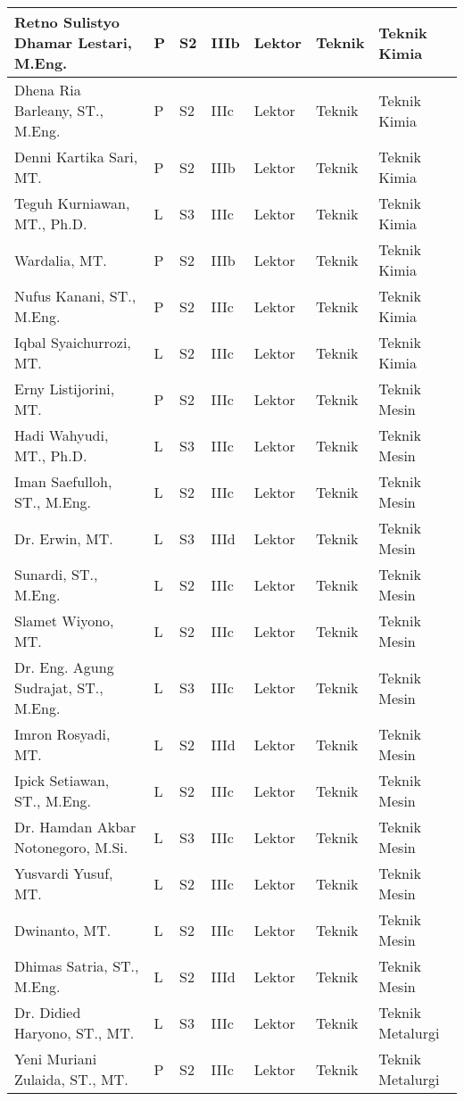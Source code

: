 \documentclass[
]{book}
\begin{document}
\begin{longtable}{l|l|l|l|l|l|l}
Retno Sulistyo Dhamar Lestari, M.Eng. & P & S2 & IIIb & Lektor & Teknik & Teknik Kimia\\
\hline
Dhena Ria Barleany, ST., M.Eng. & P & S2 & IIIc & Lektor & Teknik & Teknik Kimia\\
\hline
Denni Kartika Sari, MT. & P & S2 & IIIb & Lektor & Teknik & Teknik Kimia\\
\hline
Teguh Kurniawan, MT., Ph.D. & L & S3 & IIIc & Lektor & Teknik & Teknik Kimia\\
\hline
Wardalia, MT. & P & S2 & IIIb & Lektor & Teknik & Teknik Kimia\\
\hline
Nufus Kanani, ST., M.Eng. & P & S2 & IIIc & Lektor & Teknik & Teknik Kimia\\
\hline
Iqbal Syaichurrozi, MT. & L & S2 & IIIc & Lektor & Teknik & Teknik Kimia\\
\hline
Erny Listijorini, MT. & P & S2 & IIIc & Lektor & Teknik & Teknik Mesin\\
\hline
Hadi Wahyudi, MT., Ph.D. & L & S3 & IIIc & Lektor & Teknik & Teknik Mesin\\
\hline
Iman Saefulloh, ST., M.Eng. & L & S2 & IIIc & Lektor & Teknik & Teknik Mesin\\
\hline
Dr. Erwin, MT. & L & S3 & IIId & Lektor & Teknik & Teknik Mesin\\
\hline
Sunardi, ST., M.Eng. & L & S2 & IIIc & Lektor & Teknik & Teknik Mesin\\
\hline
Slamet Wiyono, MT. & L & S2 & IIIc & Lektor & Teknik & Teknik Mesin\\
\hline
Dr. Eng. Agung Sudrajat, ST., M.Eng. & L & S3 & IIIc & Lektor & Teknik & Teknik Mesin\\
\hline
Imron Rosyadi, MT. & L & S2 & IIId & Lektor & Teknik & Teknik Mesin\\
\hline
Ipick Setiawan, ST., M.Eng. & L & S2 & IIIc & Lektor & Teknik & Teknik Mesin\\
\hline
Dr. Hamdan Akbar Notonegoro, M.Si. & L & S3 & IIIc & Lektor & Teknik & Teknik Mesin\\
\hline
Yusvardi Yusuf, MT. & L & S2 & IIIc & Lektor & Teknik & Teknik Mesin\\
\hline
Dwinanto, MT. & L & S2 & IIIc & Lektor & Teknik & Teknik Mesin\\
\hline
Dhimas Satria, ST., M.Eng. & L & S2 & IIId & Lektor & Teknik & Teknik Mesin\\
\hline
Dr. Didied Haryono, ST., MT. & L & S3 & IIIc & Lektor & Teknik & Teknik Metalurgi\\
\hline
Yeni Muriani Zulaida, ST., MT. & P & S2 & IIIc & Lektor & Teknik & Teknik Metalurgi\\

\end{longtable}
\end{document}
